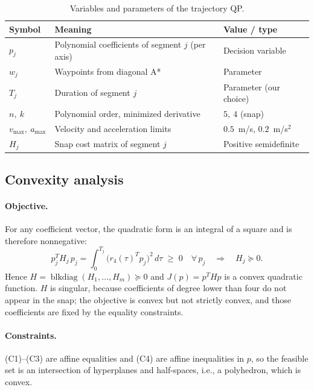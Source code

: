 \begin{table}[htbp]
\centering
\caption{Variables and parameters of the trajectory QP.}
\label{tab:variables}
\begin{tabular}{>{\raggedright\arraybackslash}p{2.4cm} >{\raggedright\arraybackslash}p{5.4cm} >{\raggedright\arraybackslash}p{3.4cm}}
\toprule
\textbf{Symbol} & \textbf{Meaning} & \textbf{Value / type}\\
\midrule
$p_j$ & Polynomial coefficients of segment $j$ (per axis) & Decision variable\\
$w_j$ & Waypoints from diagonal A* & Parameter\\
$T_j$ & Duration of segment $j$ & Parameter (our choice)\\
$n,\ k$ & Polynomial order, minimized derivative & $5,\ 4$ (snap)\\
$v_{\max},\ a_{\max}$ & Velocity and acceleration limits & $0.5$~m/s, $0.2$~m/s$^2$\\
$H_j$ & Snap cost matrix of segment $j$ & Positive semidefinite\\
\bottomrule
\end{tabular}
\end{table}

\subsection{Convexity analysis}
\paragraph{Objective.} For any coefficient vector, the quadratic form is an integral of a square and is therefore nonnegative:
\begin{equation}
p_j^T H_j\, p_j = \int_{0}^{T_j}\big(r_4(\tau)^T p_j\big)^2\,d\tau \;\ge\; 0 \quad \forall\, p_j
\quad\Longrightarrow\quad H_j \succeq 0 .
\label{eq:psd}
\end{equation}
Hence $H=\operatorname{blkdiag}(H_1,\dots,H_m)\succeq 0$ and $J(p)=p^THp$ is a convex quadratic function. $H$ is singular, because coefficients of degree lower than four do not appear in the snap; the objective is convex but not strictly convex, and those coefficients are fixed by the equality constraints.

\paragraph{Constraints.} (C1)--(C3) are affine equalities and (C4) are affine inequalities in $p$, so the feasible set is an intersection of hyperplanes and half-spaces, i.e., a polyhedron, which is convex.

